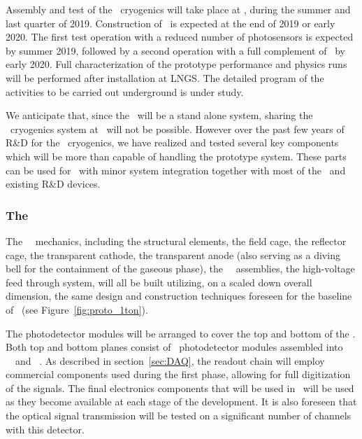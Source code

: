 Assembly and test of the \DSks\ cryogenics will take place at \CERN, during the summer and last quarter of 2019. Construction of \DSps\ is expected at the end of 2019 or early 2020. The first test operation with a reduced number of photosensors is expected by summer 2019, followed by a second operation with a full complement of \DSkPdms\ by early 2020. Full characterization of the prototype performance and physics runs will be performed after installation at LNGS. The detailed program of the activities to be carried out underground is under study.

We anticipate that, since the \DSps\ will be a stand alone system, sharing the \DSks\ cryogenics system at \LNGS\ will not be possible. However over the past few years of R\&D for the \DSks\ cryogenics, we have realized and tested several key components which will be more than capable of handling the prototype system. These parts can be used for \DSps\ with minor system integration together with most of the \DSfs\ and existing R\&D devices.

\subsubsection{The \DSps\ \TPC}

The \DSps\ \TPC\ mechanics, including the structural elements, the field cage, the reflector cage, the transparent cathode, the transparent anode (also serving as a diving bell for the containment of the gaseous phase), the \SiPM\ \DSkPdm\ assemblies, the high-voltage feed through system, will all be built utilizing, on a scaled down overall dimension, the same design and construction techniques foreseen for the baseline of \DSks\ (see Figure~\ref{fig:proto_1ton}). 

The photodetector modules will be arranged to cover the top and bottom of the \TPC. Both top and bottom planes consist of \DSpPdmsHalfNumber\ photodetector modules assembled into \DSpSQBsNumber\ \SQBs\ and \DSpTRBsNumber\ \TRBs. As described in section~\ref{sec:DAQ}, the readout chain will employ commercial components used during the first phase, allowing for full digitization of the signals.  The final electronics components that will be used in \DSks\ will be used as they become available at each stage of the development. It is also foreseen that the optical signal transmission will be tested on a significant number of channels with this detector.

